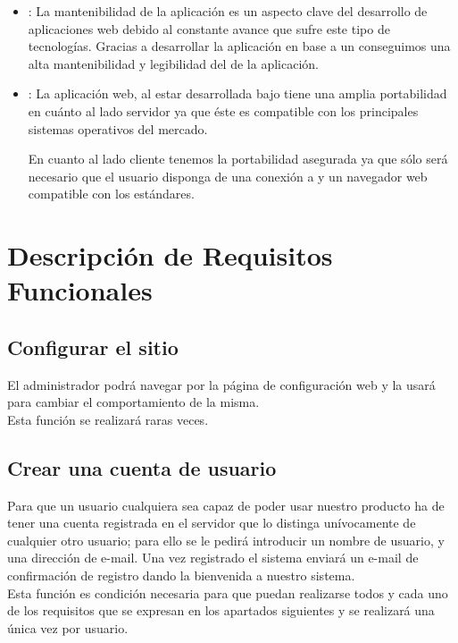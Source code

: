 \begin{itemize}
     \item {}: La mantenibilidad de la
       aplicación es un aspecto clave del desarrollo de aplicaciones
       web debido al constante avance que sufre este tipo de
       tecnologías. Gracias a desarrollar la aplicación en base a un
       conseguimos una alta mantenibilidad y legibilidad del
        de la aplicación.

     \item {}: La aplicación web, al estar
       desarrollada bajo  tiene una amplia
       portabilidad en cuánto al lado servidor ya que éste es
       compatible con los principales sistemas operativos del mercado.

       En cuanto al lado cliente tenemos la portabilidad asegurada
       ya que sólo será necesario que el usuario disponga de una
       conexión a  y un navegador web compatible con
       los estándares.
\end{itemize}

\section{Descripción de Requisitos Funcionales}

\subsection{Configurar el sitio}
El administrador podrá navegar por la página de configuración web y la
usará para cambiar el comportamiento de la misma.\\

Esta función se realizará raras veces.
\subsection{Crear una cuenta de usuario}
Para que un usuario cualquiera sea capaz de poder usar nuestro
producto ha de tener una cuenta registrada en el servidor que lo
distinga unívocamente de cualquier otro usuario; para ello se le
pedirá introducir un nombre de usuario, y una dirección de e-mail. Una
vez registrado el sistema enviará un e-mail de confirmación de
registro dando la bienvenida a nuestro sistema.\\

Esta función es condición necesaria para que puedan realizarse todos y
cada uno de los requisitos que se expresan en los apartados siguientes
y se realizará una única vez por usuario.

